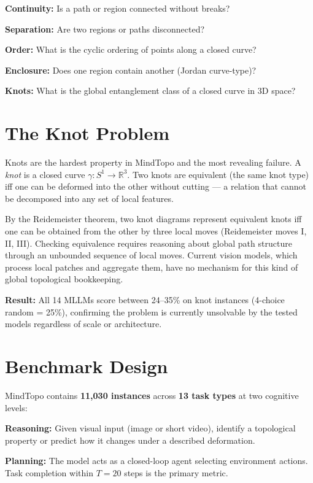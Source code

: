 \documentclass[10pt,twocolumn]{article}
\begin{document}
\textbf{Continuity:} Is a path or region connected without breaks?

\textbf{Separation:} Are two regions or paths disconnected?

\textbf{Order:} What is the cyclic ordering of points along a closed curve?

\textbf{Enclosure:} Does one region contain another (Jordan curve-type)?

\textbf{Knots:} What is the global entanglement class of a closed
curve in 3D space?

\section{The Knot Problem}

Knots are the hardest property in MindTopo and the most revealing
failure. A \emph{knot} is a closed curve $\gamma: S^1 \to \mathbb{R}^3$.
Two knots are equivalent (the same knot type) iff one can be
deformed into the other without cutting --- a relation that cannot
be decomposed into any set of local features.

By the Reidemeister theorem, two knot diagrams represent equivalent
knots iff one can be obtained from the other by three local moves
(Reidemeister moves I, II, III). Checking equivalence requires
reasoning about global path structure through an unbounded sequence
of local moves. Current vision models, which process local patches
and aggregate them, have no mechanism for this kind of global
topological bookkeeping.

\textbf{Result:} All 14 MLLMs score between 24--35\% on knot
instances (4-choice random = 25\%), confirming the problem is
currently unsolvable by the tested models regardless of scale or
architecture.

\section{Benchmark Design}

MindTopo contains \textbf{11,030 instances} across \textbf{13 task types}
at two cognitive levels:

\textbf{Reasoning:} Given visual input (image or short video),
identify a topological property or predict how it changes under a
described deformation.

\textbf{Planning:} The model acts as a closed-loop agent selecting
environment actions. Task completion within $T = 20$ steps is the
primary metric.
\end{document}
